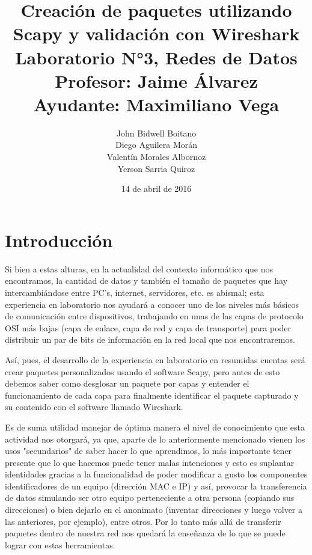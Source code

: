 \documentclass[spanish]{udpreport}
\begin{document}
\title{
	Creación de paquetes utilizando Scapy y validación con Wireshark\\[2ex]
	\normalsize
	Laboratorio N°3, Redes de Datos\\
    Profesor: Jaime Álvarez\\
	Ayudante: Maximiliano Vega
    }
\author{John Bidwell Boitano\\ Diego Aguilera Morán \\ Valentín Morales Albornoz \\ Yerson Sarria Quiroz}
\date{14 de abril de 2016}
\maketitle

\tableofcontents

\chapter{Introducción}
Si bien a estas alturas, en la actualidad del contexto informático que nos encontramos, la cantidad de datos y también el tamaño de paquetes que hay intercambiándose entre PC's, internet, servidores, etc. es abismal; esta experiencia en laboratorio nos ayudará a conocer uno de los niveles más básicos de comunicación entre dispositivos, trabajando en unas de las capas de protocolo OSI más bajas (capa de enlace, capa de red y capa de transporte) para poder distribuir un par de bits de información en la red local que nos encontraremos.

Así, pues, el desarrollo de la experiencia en laboratorio en resumidas cuentas será crear paquetes personalizados usando el software Scapy, pero antes de esto debemos saber como desglosar un paquete por capas y entender el funcionamiento de cada capa para finalmente identificar el paquete capturado y su contenido con el software llamado Wireshark.

Es de suma utilidad manejar de óptima manera el nivel de conocimiento que esta actividad nos otorgará, ya que, aparte de lo anteriormente mencionado vienen los usos "secundarios" de saber hacer lo que aprendimos, lo más importante tener presente que lo que hacemos puede tener malas intenciones y esto es suplantar identidades gracias a la funcionalidad de poder modificar a gusto los componentes identificadores de un equipo (dirección MAC e IP) y así, provocar la transferencia de datos simulando ser otro equipo perteneciente a otra persona (copiando sus direcciones) o bien dejarlo en el anonimato (inventar direcciones y luego volver a las anteriores, por ejemplo), entre otros. Por lo tanto más allá de transferir paquetes dentro de nuestra red nos quedará la enseñanza de lo que se puede lograr con estas herramientas.
\end{document}
